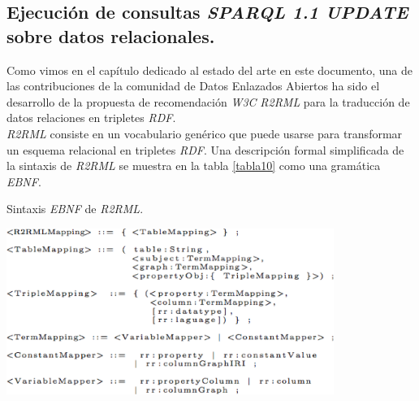 \subsection{Ejecuci\'on de consultas \textit{SPARQL 1.1 UPDATE} sobre datos relacionales.}

Como vimos en el cap\'itulo dedicado al estado del arte en este documento, una de las contribuciones de la comunidad de Datos Enlazados Abiertos ha sido el desarrollo de la propuesta de recomendaci\'on \textit{W3C} \textit{R2RML} \cite{r2rml} para la traducci\'on de datos relaciones en tripletes \textit{RDF}.\\
\textit{R2RML} consiste en un vocabulario gen\'erico que puede usarse para transformar un esquema relacional en tripletes \textit{RDF}. Una descripci\'on formal simplificada de la sintaxis de \textit{R2RML} se muestra en la tabla \ref{tabla10} como una gram\'atica \textit{EBNF}.\\

\begin{table}
\vspace{2.4in}
\caption{Sintaxis \textit{EBNF} de \textit{R2RML}.}
\vspace{5mm}
\includegraphics[width=0.8\textwidth]{tabla10}
\label{tabla10}
\end{table}


